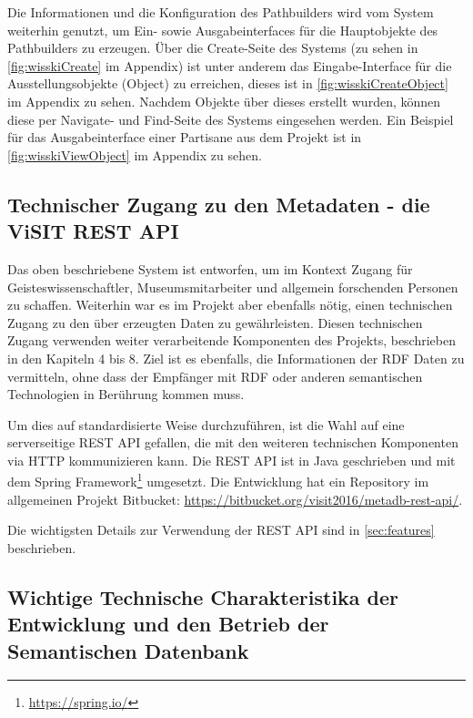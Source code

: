 \begin{description}
\end{description}

Die Informationen und die Konfiguration des Pathbuilders wird vom \wisski System weiterhin genutzt, um Ein- sowie Ausgabeinterfaces für die Hauptobjekte des Pathbuilders zu erzeugen. Über die Create-Seite des \wisski Systems (zu sehen in \autoref{fig:wisskiCreate} im Appendix) ist unter anderem das Eingabe-Interface für die Ausstellungsobjekte (Object) zu erreichen, dieses ist in \autoref{fig:wisskiCreateObject} im Appendix zu sehen. Nachdem Objekte über dieses erstellt wurden, können diese per Navigate- und Find-Seite des \wisski Systems eingesehen werden. Ein Beispiel für das Ausgabeinterface einer Partisane aus dem \visit Projekt ist in \autoref{fig:wisskiViewObject} im Appendix zu sehen.

\subsection{Technischer Zugang zu den Metadaten - die ViSIT REST API}\label{sec:rest}

Das oben beschriebene \wisski System ist entworfen, um im \visit Kontext Zugang für Geisteswissenschaftler, Museumsmitarbeiter und allgemein forschenden Personen zu schaffen. Weiterhin war es im \visit Projekt aber ebenfalls nötig, einen technischen Zugang zu den über \wisski erzeugten Daten zu gewährleisten. Diesen technischen Zugang verwenden weiter verarbeitende Komponenten des Projekts, beschrieben in den Kapiteln 4 bis 8. Ziel ist es ebenfalls, die Informationen der RDF Daten zu vermitteln, ohne dass der Empfänger mit RDF oder anderen semantischen Technologien in Berührung kommen muss.

Um dies auf standardisierte Weise durchzuführen, ist die Wahl auf eine serverseitige REST API gefallen, die mit den weiteren technischen Komponenten via HTTP kommunizieren kann. Die REST API ist in Java geschrieben und mit dem Spring Framework\footnote{\url{https://spring.io/}} umgesetzt. Die Entwicklung hat ein Repository im allgemeinen \visit Projekt Bitbucket: \url{https://bitbucket.org/visit2016/metadb-rest-api/}.

Die wichtigsten Details zur Verwendung der \visit REST API sind in \autoref{sec:features} beschrieben.

\subsection{Wichtige Technische Charakteristika der Entwicklung und den Betrieb der Semantischen Datenbank}\label{sec:features}

